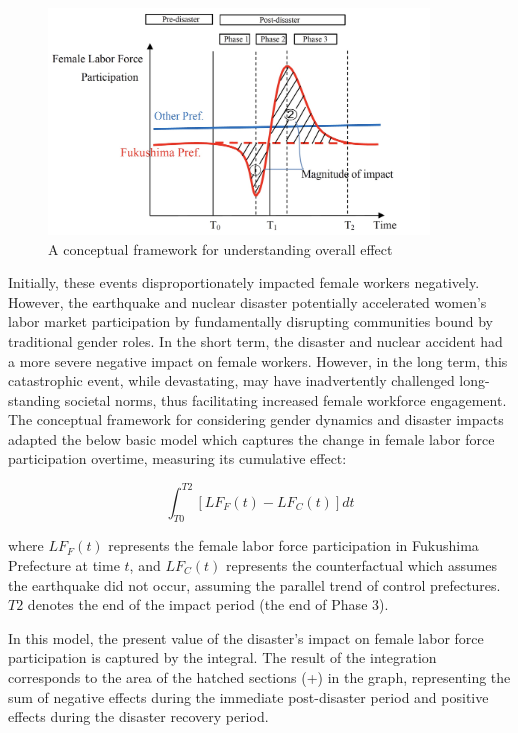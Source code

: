 \documentclass[a4paper,12pt]{article}
\begin{document}
\begin{figure}[h!]
    \centering
    \includegraphics[width=0.9\textwidth]{A conceptual model.jpeg}  %
    \caption{A conceptual framework for understanding overall effect}
    \label{fig:conceptual_model}
\end{figure}

Initially, these events disproportionately impacted female workers negatively. However, the earthquake and nuclear disaster potentially accelerated women's labor market participation by fundamentally disrupting communities bound by traditional gender roles. In the short term, the disaster and nuclear accident had a more severe negative impact on female workers. However, in the long term, this catastrophic event, while devastating, may have inadvertently challenged long-standing societal norms, thus facilitating increased female workforce engagement. The conceptual framework for considering gender dynamics and disaster impacts adapted the below basic model which captures the change in female labor force participation overtime, measuring its cumulative effect:

\begin{equation}
\int_{T0}^{T2} [LF_F(t) - LF_C(t)] dt
\end{equation}

where $LF_F(t)$ represents the female labor force participation in Fukushima Prefecture at time $t$, and $LF_C(t)$ represents the counterfactual which assumes the earthquake did not occur, assuming the parallel trend of control prefectures. $T2$ denotes the end of the impact period (the end of Phase 3).

In this model, the present value of the disaster's impact on female labor force participation is captured by the integral. The result of the integration corresponds to the area of the hatched sections (+) in the graph, representing the sum of negative effects during the immediate post-disaster period and positive effects during the disaster recovery period.
\end{document}
